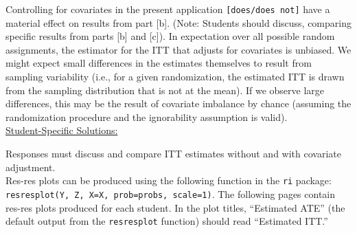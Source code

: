 \documentclass[11pt,notitlepage]{article}
\begin{document}
Controlling for covariates in the present application {\tt [does/does not]} have a material effect on results from part [b]. (Note: Students should discuss, comparing specific results from parts [b] and [c]). In expectation over all possible random assignments, the estimator for the ITT that adjusts for covariates is unbiased. We might expect small differences in the estimates themselves to result from sampling variability (i.e., for a given randomization, the estimated ITT is drawn from the sampling distribution that is not at the mean). If we observe large differences, this may be the result of covariate imbalance by chance (assuming the randomization procedure and the ignorability assumption is valid).\\



\underline{{\sc Student-Specific Solutions:}}

Responses must discuss and compare ITT estimates without and with covariate adjustment.\\

Res-res plots can be produced using the following function in the {\tt ri} package: {\tt resresplot(Y, Z, X=X, prob=probs, scale=1)}. The following pages contain res-res plots produced for each student. In the plot titles, ``Estimated ATE'' (the default output from the {\tt resresplot} function) should read ``Estimated ITT.''
\end{document}
